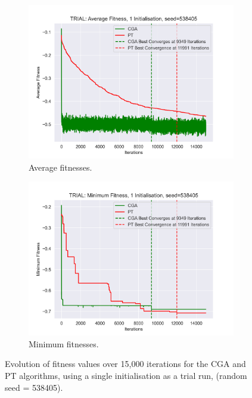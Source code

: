\documentclass[10pt]{article}
\begin{document}
\begin{multicols}{2}
\begin{figure}[H]
    \centering
    \begin{subfigure}{0.48\textwidth}
        \includegraphics[width=\textwidth]{../figures/Final Comparison/CGA vs PT Average Fitness TRIAL.png}
        \caption{Average fitnesses.}
        \label{fig:AVG_trial_fitness}
    \end{subfigure}
    \begin{subfigure}{0.48\textwidth}
        \includegraphics[width=\textwidth]{../figures/Final Comparison/CGA vs PT Minimum Fitness TRIAL.png}
        \caption{Minimum fitnesses.}
        \label{fig:MIN_trial_fitness}
    \end{subfigure}
\captionsetup{justification=centering}
\caption{Evolution of fitness values over 15,000 iterations for the CGA and PT algorithms, using a single initialisation as a trial run, (random seed = 538405).}
\label{fig:trial_fitness}
\end{figure}


\end{multicols}
\end{document}
